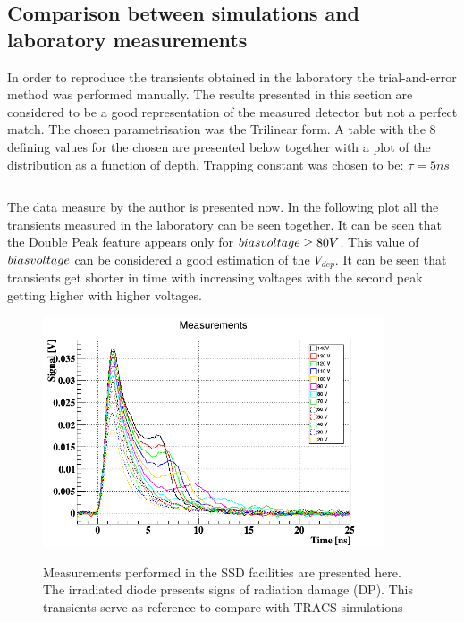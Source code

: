 \subsection{Comparison between simulations and laboratory measurements}


In order to reproduce the transients obtained in the laboratory the trial-and-error method was performed manually. The results presented in this section are considered to be a good representation of the measured detector but not a perfect match. The chosen \neff parametrisation was the Trilinear form. A table with the 8 defining values for the chosen \neff are presented below together with a plot of the \neff distribution as a function of depth. Trapping constant was chosen to be: $\tau = 5 ns$

\begin{centering}
\begin{tabular}{c}
	

\end{tabular}
\end{centering}

The data measure by the author is presented now. In the following plot all the transients measured in the laboratory can be seen together. It can be seen that the Double Peak feature appears only for $bias voltage \geq 80 V$. This value of $bias voltage$ can be considered a good estimation of the $V_{dep}$. It can be seen that transients get shorter in time with increasing voltages with the second peak getting higher with higher voltages. 

\begin{figure}[H]
	\centering
	\includegraphics[width=0.9\textwidth]{c1.png}
	\label{fig:mues2}
	\caption{Measurements performed in the SSD facilities are presented here. The irradiated diode presents signs of radiation damage (DP). This transients serve as reference to compare with TRACS simulations}
\end{figure}
				

